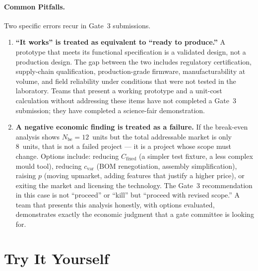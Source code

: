 \paragraph{Common Pitfalls.}
\label{sec:ch17-pitfalls}

Two specific errors recur in Gate~3 submissions.

\begin{enumerate}
  \item \textbf{``It works'' is treated as equivalent to ``ready to
        produce.''}
        A prototype that meets its functional specification is a validated
        design, not a production design.
        The gap between the two includes regulatory certification, supply-chain
        qualification, production-grade firmware, manufacturability at volume,
        and field reliability under conditions that were not tested in the
        laboratory.
        Teams that present a working prototype and a unit-cost calculation
        without addressing these items have not completed a Gate~3 submission;
        they have completed a science-fair demonstration.

  \item \textbf{A negative economic finding is treated as a failure.}
        If the break-even analysis shows $N_{\text{be}} = 12$~units but the
        total addressable market is only 8~units, that is not a failed project
        --- it is a project whose scope must change.
        Options include: reducing $C_{\text{fixed}}$ (a simpler test fixture,
        a less complex mould tool), reducing $c_{\text{var}}$ (BOM
        renegotiation, assembly simplification), raising $p$ (moving
        upmarket, adding features that justify a higher price), or exiting
        the market and licensing the technology.
        The Gate~3 recommendation in this case is not ``proceed'' or ``kill''
        but ``proceed with revised scope.''
        A team that presents this analysis honestly, with options evaluated,
        demonstrates exactly the economic judgment that a gate committee is
        looking for.
\end{enumerate}

\section*{Try It Yourself}
\label{sec:ch17-try}

